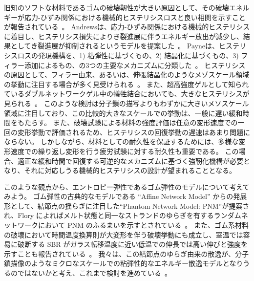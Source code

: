 \documentclass[uplatex,10pt,a4paper,twocolumn]{jsarticle}
\begin{document}


旧知のソフトな材料であるゴムの破壊靭性が大きい原因として、その破壊エネルギーが応力-ひずみ関係における機械的ヒステリシスロスと良い相関を示すことが報告されている~\cite{payne1}。
Andrewsは、応力-ひずみ関係における機械的ヒステリシスに着目し、ヒステリシス損失によりき裂進展に伴うエネルギー放出が減少し、結果としてき裂進展が抑制されるというモデルを提案した~\cite{andrews}。
Payneは、ヒステリシスロスの発現機構を、1) 粘弾性に基づくもの、2) 結晶化に基づくもの、3) フィラー添加によるもの、の3つの主要なメカニズムに分類した~\cite{payne2}。
ヒステリシスの原因として、フィラー由来、あるいは、伸張結晶化のようなメゾスケール領域の挙動に注目する場合が多く見受けられる~\cite{zhang}。
また、超高強度ゲルとして知られているダブルネットワークゲル中の犠牲結合においても、大きなヒステリシスが見られる~\cite{gong}。
このような検討は分子鎖の描写よりもわずかに大きいメソスケール領域に注目しており、この比較的大きなスケールでの挙動は、一般に遅い緩和時間をもたらす。
また、破壊試験による材料の強度評価は任意の変形速度での一回の変形挙動で評価されるため、ヒステリシスの回復挙動の遅速はあまり問題にならない。
しかしながら、材料としての耐久性を保証するためには、多様な変形速度での繰り返し変形を行う疲労試験に対する耐久性も重要である。
この場合、適正な緩和時間で回復する可逆的なメカニズムに基づく強靭化機構が必要となり、それに対応しうる機械的ヒステリシスの設計が望まれることとなる。

このような観点から、エントロピー弾性であるゴム弾性のモデルについて考えてみよう。
ゴム弾性の古典的なモデルである ``Affine Network Model'' からの発展形として、結節点の揺らぎに注目した``Phantom Network Model: PNM''が提案され、Flory によればメルト状態と同一なストランドのゆらぎを有するランダムネットワークにおいて PNM のふるまいを示すとされている~\cite{flory}。
また、ゴム系材料の破壊において時間温度換算則が大変形を伴う破壊挙動にも成立し、室温では容易に破断する SBR がガラス転移温度に近い低温での伸長では高い伸びと強度を示すことも報告されている~\cite{smith}。
我々は、この結節点のゆらぎ由来の散逸が、分子鎖描像のようなミクロなスケールでの粘弾性的なエネルギー散逸モデルとなりうるのではないかと考え、これまで検討を進めている~\cite{sasaki}。
\end{document}
